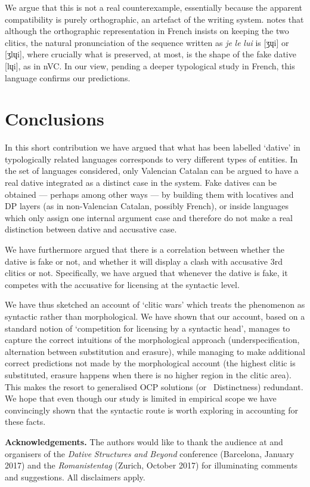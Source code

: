 \documentclass[output=paper,colorlinks,citecolor=brown]{./langscibook}
\begin{document}
We argue that this is not a real counterexample, essentially because the apparent compatibility is purely orthographic, an artefact of the writing system. \citet{Schwarze2001} notes that although the orthographic representation in French insists on keeping the two clitics, the natural pronunciation of the sequence written as \textit{je} \textit{le} \textit{lui} is [ʒɥi] or [ʒlɥi], where crucially what is preserved, at most, is the shape of the fake dative [lɥi], as in nVC. In our view, pending a deeper typological study in French, this language confirms our predictions. 

\section{Conclusions} %

In this short contribution we have argued that what has been labelled ‘dative’ in typologically related languages corresponds to very different types of entities. In the set of languages considered, only Valencian Catalan can be argued to have a real dative integrated as a distinct case in the system. Fake datives can be obtained — perhaps among other ways — by building them with locatives and DP layers (as in non-Valencian Catalan, possibly French), or inside languages which only assign one internal argument case and therefore do not make a real distinction between dative and accusative case. 

We have furthermore argued that there is a correlation between whether the dative is fake or not, and whether it will display a clash with accusative 3rd clitics or not. Specifically, we have argued that whenever the dative is fake, it competes with the accusative for licensing at the syntactic level. 

We have thus sketched an account of ‘clitic wars’ which treats the phenomenon as syntactic rather than morphological. We have shown that our account, based on a standard notion of ‘competition for licensing by a syntactic head’, manages to capture the correct intuitions of the morphological approach (underspecification, alternation between substitution and erasure), while managing to make additional correct predictions not made by the morphological account (the highest clitic is substituted, erasure happens when there is no higher region in the clitic area). This makes the resort to generalised OCP solutions (or \citealt{Richards2010}~Distinctness) redundant. We hope that even though our study is limited in empirical scope we have convincingly shown that the syntactic route is worth exploring in accounting for these facts. 

\textbf{Acknowledgements.} The authors would like to thank the audience at and organisers of the \textit{Dative} \textit{Structures} \textit{and} \textit{Beyond} conference (Barcelona, January 2017) and the \textit{Romanistentag} (Zurich, October 2017) for illuminating comments and suggestions. All disclaimers apply.

\sloppy\printbibliography[heading=subbibliography,notkeyword=this]
\end{document}
